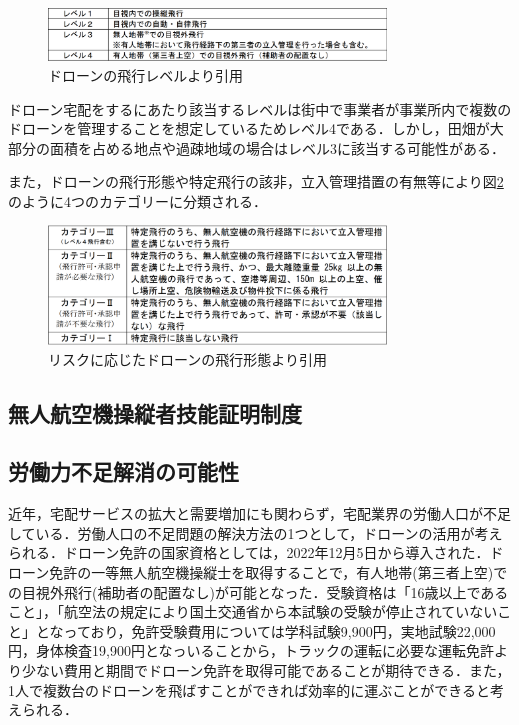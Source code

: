 \documentclass[a4paper, titlepage]{jsarticle}
\begin{document}
\begin{figure}[htbp]
  \centering
  \includegraphics[width=0.8\textwidth]{flying_level.pdf}
  \caption{ドローンの飛行レベル\cite{delivery_guidelines_2023}より引用}
  \label{fig:dron_level}
\end{figure}

ドローン宅配をするにあたり該当するレベルは街中で事業者が事業所内で複数のドローンを管理することを想定しているためレベル4である．しかし，田畑が大部分の面積を占める地点や過疎地域の場合はレベル3に該当する可能性がある．

また，ドローンの飛行形態や特定飛行の該非，立入管理措置の有無等により図\ref{fig:dron_category}のように4つのカテゴリーに分類される．
\begin{figure}[htbp]
  \centering
  \includegraphics[width=0.8\textwidth]{dron_category.pdf}
  \caption{リスクに応じたドローンの飛行形態\cite{delivery_guidelines_2023}より引用}
  \label{fig:dron_category}
\end{figure}

\subsection{無人航空機操縦者技能証明制度}

\subsection{労働力不足解消の可能性}
近年，宅配サービスの拡大と需要増加にも関わらず，宅配業界の労働人口が不足している．労働人口の不足問題の解決方法の1つとして，ドローンの活用が考えられる．ドローン免許の国家資格としては，2022年12月5日から導入された．ドローン免許の一等無人航空機操縦士を取得することで，有人地帯(第三者上空)での目視外飛行(補助者の配置なし)が可能となった．受験資格は「16歳以上であること」，「航空法の規定により国土交通省から本試験の受験が停止されていないこと」となっており，免許受験費用については学科試験9,900円，実地試験22,000円，身体検査19,900円となっいることから，トラックの運転に必要な運転免許より少ない費用と期間でドローン免許を取得可能であることが期待できる．また，1人で複数台のドローンを飛ばすことができれば効率的に運ぶことができると考えられる．
\end{document}
